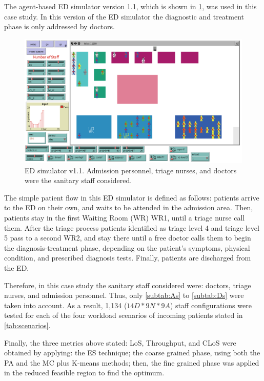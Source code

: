 \documentclass[11pt]{article} %
\begin{document}
The agent-based ED simulator version 1.1, which is shown in \ref{fig:ED-SIM-0},
was used in this case study. In this version of the ED simulator the
diagnostic and treatment phase is only addressed by doctors. 
\begin{figure}[h]
\noindent \begin{centering}
\centering \includegraphics[width=0.9\columnwidth,height=0.16\paperheight]{figs2/ED_Netlogo-0}
\par\end{centering}

\noindent \caption{ED simulator v1.1. Admission personnel, triage nurses, and doctors
were the sanitary staff considered.}


\label{fig:ED-SIM-0} 
\end{figure}
 The simple patient flow in this ED simulator is defined as follows:
patients arrive to the ED on their own, and waits to be attended in
the admission area. Then, patients stay in the first Waiting Room
(WR) WR1, until a triage nurse call them. After the triage process
patients identified as triage level 4 and triage level 5 pass to a
second WR2, and stay there until a free doctor calls them to begin
the diagnosis-treatment phase, depending on the patient's symptoms,
physical condition, and prescribed diagnosis tests. Finally, patients
are discharged from the ED. 

Therefore, in this case study the sanitary staff considered were:
doctors, triage nurses, and admission personnel. Thus, only \ref{subtab:As}
to \ref{subtab:Ds} were taken into account. As a result, 1,134 ($14D*9N*9A$)
staff configurations were tested for each of the four workload scenarios
of incoming patients stated in \ref{tab:scenarios}. 

Finally, the three metrics above stated: LoS, Throughput, and CLoS
were obtained by applying: the ES technique; the coarse grained phase,
using both the PA and the MC plus K-means methods; then, the fine
grained phase was applied in the reduced feasible region to find the
optimum.
\end{document}
